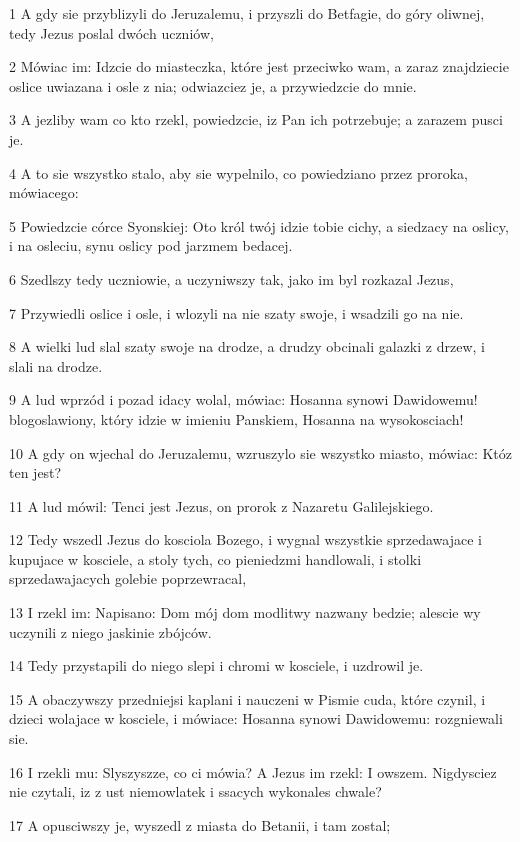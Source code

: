 \par 1 A gdy sie przyblizyli do Jeruzalemu, i przyszli do Betfagie, do góry oliwnej, tedy Jezus poslal dwóch uczniów,
\par 2 Mówiac im: Idzcie do miasteczka, które jest przeciwko wam, a zaraz znajdziecie oslice uwiazana i osle z nia; odwiazciez je, a przywiedzcie do mnie.
\par 3 A jezliby wam co kto rzekl, powiedzcie, iz Pan ich potrzebuje; a zarazem pusci je.
\par 4 A to sie wszystko stalo, aby sie wypelnilo, co powiedziano przez proroka, mówiacego:
\par 5 Powiedzcie córce Syonskiej: Oto król twój idzie tobie cichy, a siedzacy na oslicy, i na osleciu, synu oslicy pod jarzmem bedacej.
\par 6 Szedlszy tedy uczniowie, a uczyniwszy tak, jako im byl rozkazal Jezus,
\par 7 Przywiedli oslice i osle, i wlozyli na nie szaty swoje, i wsadzili go na nie.
\par 8 A wielki lud slal szaty swoje na drodze, a drudzy obcinali galazki z drzew, i slali na drodze.
\par 9 A lud wprzód i pozad idacy wolal, mówiac: Hosanna synowi Dawidowemu! blogoslawiony, który idzie w imieniu Panskiem, Hosanna na wysokosciach!
\par 10 A gdy on wjechal do Jeruzalemu, wzruszylo sie wszystko miasto, mówiac: Któz ten jest?
\par 11 A lud mówil: Tenci jest Jezus, on prorok z Nazaretu Galilejskiego.
\par 12 Tedy wszedl Jezus do kosciola Bozego, i wygnal wszystkie sprzedawajace i kupujace w kosciele, a stoly tych, co pieniedzmi handlowali, i stolki sprzedawajacych golebie poprzewracal,
\par 13 I rzekl im: Napisano: Dom mój dom modlitwy nazwany bedzie; alescie wy uczynili z niego jaskinie zbójców.
\par 14 Tedy przystapili do niego slepi i chromi w kosciele, i uzdrowil je.
\par 15 A obaczywszy przedniejsi kaplani i nauczeni w Pismie cuda, które czynil, i dzieci wolajace w kosciele, i mówiace: Hosanna synowi Dawidowemu: rozgniewali sie.
\par 16 I rzekli mu: Slyszyszze, co ci mówia? A Jezus im rzekl: I owszem. Nigdysciez nie czytali, iz z ust niemowlatek i ssacych wykonales chwale?
\par 17 A opusciwszy je, wyszedl z miasta do Betanii, i tam zostal;
